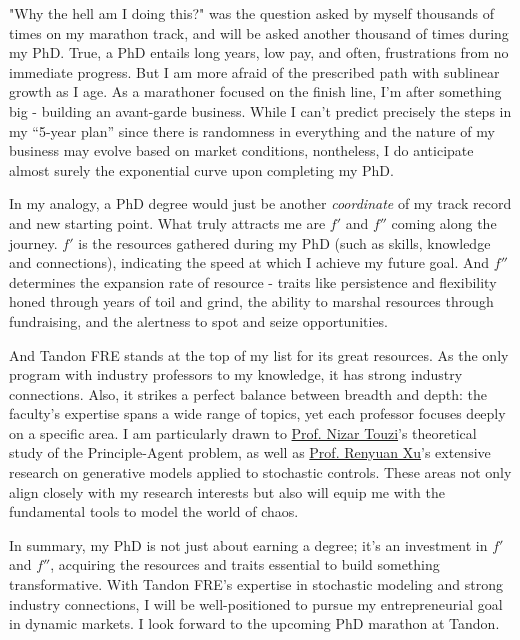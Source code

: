 \documentclass[12pt, a4paper]{article}
\newcommand{\NT}{\href{https://engineering.nyu.edu/faculty/nizar-touzi}{Prof. Nizar Touzi}\xspace}
\newcommand{\RX}{\href{https://engineering.nyu.edu/faculty/renyuan-xu}{Prof. Renyuan Xu}\xspace}
\def\vfootline{%
    \begingroup
    	\rule[-10pt]{0.75pt}{25pt}
    \endgroup
}
\def\header{%
\small
\begin{minipage}{150pt}
    \hfill Orange Ao 	%
   \par \hfill Tandon FRE, PhD, Fall 2025 %
\end{minipage}
}
\begin{document}
\newpage
\fancyhf{}
\fancyhead[R]{\header\hskip\linepagesep\vfootline\thepage}
\newskip\linepagesep \linepagesep 5pt\relax
\def\vfootline{%
    \begingroup
    	\rule[-10pt]{0.75pt}{25pt}
    \endgroup
}
\def\header{%
\small
\begin{minipage}{150pt}
    \hfill Orange Ao 	%
   \par \hfill Tandon FRE, PhD, Fall 2025 %
\end{minipage}
}

"Why the hell am I doing this?" was the question asked by myself thousands of times on my marathon track, and will be asked another thousand of times during my PhD. True, a PhD entails long years, low pay, and often, frustrations from no immediate progress. But I am more afraid of the prescribed path with sublinear growth as I age. As a marathoner focused on the finish line, I’m after something big - building an avant-garde business. While I can’t predict precisely the steps in my “5-year plan” since there is randomness in everything and the nature of my business may evolve based on market conditions, nontheless, I do anticipate almost surely the exponential curve upon completing my PhD.

In my analogy, a PhD degree would just be another \textit{coordinate} of my track record and new starting point. What truly attracts me are $f'$ and $f''$ coming along the journey. $f'$ is the resources gathered during my PhD (such as skills, knowledge and connections), indicating the speed at which I achieve my future goal. And $f''$ determines the expansion rate of resource - traits like persistence and flexibility honed through years of toil and grind, the ability to marshal resources through fundraising, and the alertness to spot and seize opportunities.

And Tandon FRE stands at the top of my list for its great resources. As the only program with industry professors to my knowledge, it has strong industry connections. Also, it strikes a perfect balance between breadth and depth: the faculty's expertise spans a wide range of topics, yet each professor focuses deeply on a specific area. I am particularly drawn to \NT’s theoretical study of the Principle-Agent problem, as well as \RX's extensive research on generative models applied to stochastic controls. These areas not only align closely with my research interests but also will equip me with the fundamental tools to model the world of chaos.

In summary, my PhD is not just about earning a degree; it's an investment in $f'$ and $f''$, acquiring the resources and traits essential to build something transformative. With Tandon FRE's expertise in stochastic modeling and strong industry connections, I will be well-positioned to pursue my entrepreneurial goal in dynamic markets. I look forward to the upcoming PhD marathon at Tandon.
\end{document}
